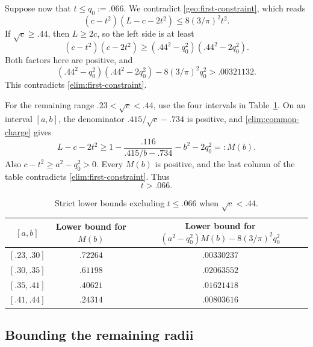 Suppose now that $t\le q_0:=.066$. We contradict
\eqref{geo:first-constraint}, which reads
\begin{equation}\label{elim:first-constraint}
 (c-t^2)(L-c-2t^2)\le8(3/\pi)^2t^2.
\end{equation}
If $\sqrt c\ge.44$, then $L\ge2c$, so the left side is at least
\[
 (c-t^2)(c-2t^2)
 \ge(.44^2-q_0^2)(.44^2-2q_0^2).
\]
Both factors here are positive, and
\begin{equation}\label{elim:large-third-small-minimum}
 (.44^2-q_0^2)(.44^2-2q_0^2)
       -8(3/\pi)^2q_0^2>.00321132.
\end{equation}
This contradicts \eqref{elim:first-constraint}.

For the remaining range $.23<\sqrt c<.44$, use the four intervals
in Table~\ref{elim:small-table}. On an interval $[a,b]$, the denominator
$.415/\sqrt c-.734$ is positive, and
\eqref{elim:common-charge} gives
\[
 L-c-2t^2
 \ge 1-\frac{.116}{.415/b-.734}-b^2-2q_0^2
 =:M(b).
\]
Also $c-t^2\ge a^2-q_0^2>0$. Every $M(b)$ is positive, and the
last column of the table contradicts \eqref{elim:first-constraint}.
Thus
\begin{equation}\label{elim:minimum-lower}
 t>.066.
\end{equation}

\begin{table}[ht]
\centering
\begin{tabular}{c|c|c}
$[a,b]$ & \shortstack{Lower bound for\\ $M(b)$} &
 \shortstack{Lower bound for\\ $(a^2-q_0^2)M(b)-8(3/\pi)^2q_0^2$}\\
\hline
$[.23,.30]$ & $.72264$ & $.00330237$\\
$[.30,.35]$ & $.61198$ & $.02063552$\\
$[.35,.41]$ & $.40621$ & $.01621418$\\
$[.41,.44]$ & $.24314$ & $.00803616$
\end{tabular}
\caption{Strict lower bounds excluding $t\le.066$ when $\sqrt c<.44$.}
\label{elim:small-table}
\end{table}

\subsection{Bounding the remaining radii}

